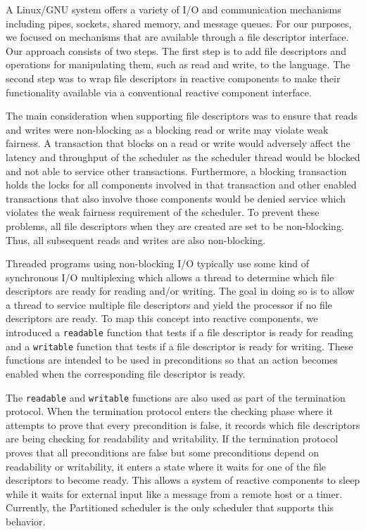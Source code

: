 A Linux/GNU system offers a variety of I/O and communication mechanisms including pipes, sockets, shared memory, and message queues.
For our purposes, we focused on mechanisms that are available through a file descriptor interface.
Our approach consists of two steps.
The first step is to add file descriptors and operations for manipulating them, such as read and write, to the language.
The second step was to wrap file descriptors in reactive components to make their functionality available via a conventional reactive component interface.

The main consideration when supporting file descriptors was to ensure that reads and writes were non-blocking as a blocking read or write may violate weak fairness.
A transaction that blocks on a read or write would adversely affect the latency and throughput of the scheduler as the scheduler thread would be blocked and not able to service other transactions.
Furthermore, a blocking transaction holds the locks for all components involved in that transaction and other enabled transactions that also involve those components would be denied service which violates the weak fairness requirement of the scheduler.
To prevent these problems, all file descriptors when they are created are set to be non-blocking.
Thus, all subsequent reads and writes are also non-blocking.

Threaded programs using non-blocking I/O typically use some kind of synchronous I/O multiplexing which allows a thread to determine which file descriptors are ready for reading and/or writing.
The goal in doing so is to allow a thread to service multiple file descriptors and yield the processor if no file descriptors are ready.
To map this concept into reactive components, we introduced a \verb+readable+ function that tests if a file descriptor is ready for reading and a \verb+writable+ function that tests if a file descriptor is ready for writing.
These functions are intended to be used in preconditions so that an action becomes enabled when the corresponding file descriptor is ready.

The \verb+readable+ and \verb+writable+ functions are also used as part of the termination protocol.
When the termination protocol enters the checking phase where it attempts to prove that every precondition is false, it records which file descriptors are being checking for readability and writability.
If the termination protocol proves that all preconditions are false but some preconditions depend on readability or writability, it enters a state where it waits for one of the file descriptors to become ready.
This allows a system of reactive components to sleep while it waits for external input like a message from a remote host or a timer.
Currently, the Partitioned scheduler is the only scheduler that supports this behavior.


